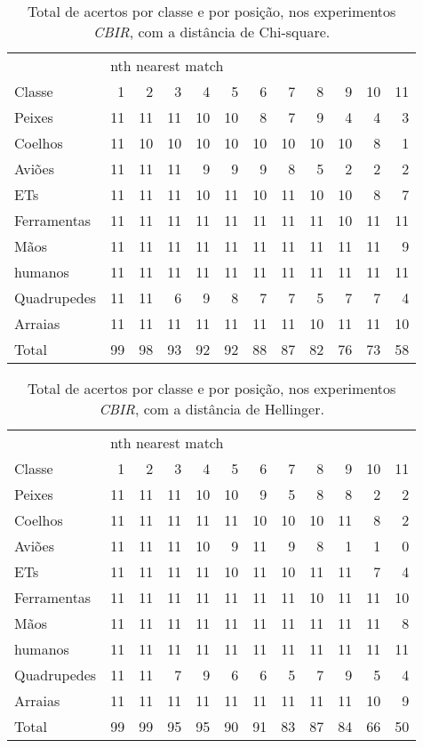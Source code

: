 \begin{table*}
\centering
\caption{\label{tab:Kimia} Total de acertos por classe e por posição, nos experimentos \emph{CBIR}, com a distância de Chi-square.}
\begin{tabular}{l| r r r r r r r r r r r}
\hline
&\multicolumn{11}{l}{nth nearest match} \\
\cline{2-12}
Classe&1&2&3&4&5&6&7&8&9&10&11 \\
 \hline
Peixes&11&11&11&10&10&8&7&9&4&4&3\\
Coelhos&11&10&10&10&10&10&10&10&10&8&1\\ 
Aviões&11&11&11&9&9&9&8&5&2&2&2\\
ETs&11&11&11&10&11&10&11&10&10&8&7\\
Ferramentas&11&11&11&11&11&11&11&11&10&11& 11\\
Mãos&11&11&11&11&11&11&11&11&11&11&9\\
humanos&11&11&11&11&11&11&11&11&11&11&11\\
Quadrupedes&11&11&6&9&8&7&7&5&7&7&4\\
Arraias&11&11&11&11&11&11&11&10&11&11&10\\
\hline
Total&99&98&93&92&92&88&87&82&76&73&58\\
\hline
\end{tabular}
\end{table*}

\begin{table*}
\centering
\caption{\label{tab:Kimia} Total de acertos por classe e por posição, nos experimentos \emph{CBIR}, com a distância de Hellinger.}
\begin{tabular}{l| r r r r r r r r r r r}
\hline
&\multicolumn{11}{l}{nth nearest match} \\
\cline{2-12}
Classe&1&2&3&4&5&6&7&8&9&10&11 \\
 \hline
Peixes&11&11&11&10&10&9&5&8&8&2&2\\
Coelhos&11&11&11&11&11&10&10&10&11&8&2\\ 
Aviões&11&11&11&10&9&11&9&8&1&1&0\\
ETs&11&11&11&11&10&11&10&11&11&7&4\\
Ferramentas&11&11&11&11&11&11&11&10&11&11& 10\\
Mãos&11&11&11&11&11&11&11&11&11&11&8\\
humanos&11&11&11&11&11&11&11&11&11&11&11\\
Quadrupedes&11&11&7&9&6&6&5&7&9&5&4\\
Arraias&11&11&11&11&11&11&11&11&11&10&9\\
\hline
Total&99&99&95&95&90&91&83&87&84&66&50\\
\hline
\end{tabular}
\end{table*}

